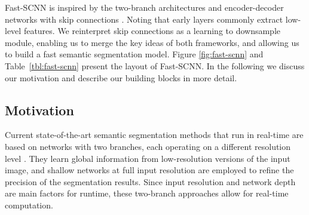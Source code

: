 \documentclass[10pt,twocolumn,letterpaper]{article}
\begin{document}
\begin{table}[t]
\begin{center}
\end{center}
\caption{Fast-SCNN uses standard convolution (Conv2D), depthwise separable convolution (DSConv), inverted residual bottleneck blocks (bottleneck), a pyramid pooling module (PPM) and a feature fusion module (FFM) block. Parameters t, c, n and s represent expansion factor of the bottleneck block, number of output channels, number of times block is repeated and stride parameter which is applied to first sequence of the repeating block. The horizontal lines separate the modules: learning to down-sample, global feature extractor, feature fusion and classifier (top to bottom).}
\label{tbl:fast-scnn}
\end{table}
Fast-SCNN is inspired by the two-branch architectures \cite{contextnet-poudel2018,BiSeNet-yu2018,gun-mazzini2018} and encoder-decoder networks with skip connections \cite{fcn-long2016,u-net-ronneberger2015}. Noting that early layers commonly extract low-level features. We reinterpret skip connections as a learning to downsample module, enabling us to merge the key ideas of both frameworks, and allowing us to build a fast semantic segmentation model. Figure \ref{fig:fast-scnn} and Table~\ref{tbl:fast-scnn} present the layout of Fast-SCNN. In the following we discuss our motivation and describe our building blocks in more detail.

\subsection{Motivation}
Current state-of-the-art semantic segmentation methods that run in real-time are based on networks with two branches, each operating on a different resolution level \cite{contextnet-poudel2018,BiSeNet-yu2018,gun-mazzini2018}. They learn global information from low-resolution versions of the input image, and shallow networks at full input resolution are employed to refine the precision of the segmentation results. Since input resolution and network depth are main factors for runtime, these two-branch approaches allow for real-time computation.
\end{document}
